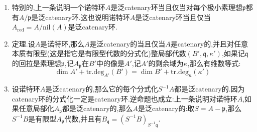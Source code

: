 \begin{enumerate}
\begin{proof}
		下面取$y_i=a_i/b\in\mathrm{Frac}(B),1\le i\le h$,取$C=B[y_1,\cdots,y_h]\subseteq\mathrm{Frac}(B)$,再取$J=(y_1,y_2,\cdots,y_h)C$和$\mathfrak{M}=J+\mathfrak{Q}C=J+\mathfrak{Q}$(因为有$C=B+J$).我们来证明$J\cap B=\mathfrak{q}_1$:一方面意$z\in J$可以表示为$u/b^k$,其中$u\in I^k$,所以如果$z\in J\cap B$,就有足够大的$v$使得$zb^v\in I$,于是$z\in(I:v^bB)=\mathfrak{q}_1$(上述断言),这说明$J\cap B\subseteq\mathfrak{q}_1$.另一方面有$b\mathfrak{q}_1\subseteq I$,所以$\mathfrak{q}_1\subseteq (1/b)I\subseteq J$,所以$\mathfrak{q}_1\subseteq J\cap B$.综上得到$J\cap B=\mathfrak{q}_1$.
		
		\qquad
		
		于是有$\mathfrak{M}\cap B=(J+\mathfrak{Q})\cap B=(J\cap B)+\mathfrak{Q}=\mathfrak{Q}$.于是有$C/J=(B+J)/J\cong B/\mathfrak{q}_1$和$C/\mathfrak{M}=(B+\mathfrak{M})/\mathfrak{M}\cong B/\mathfrak{Q}$.特别的有$\mathfrak{M}$是$C$的素理想,并且$C_{\mathfrak{M}}/JC_{\mathfrak{M}}\cong B_{\mathfrak{Q}}/\mathfrak{q}_1B_{\mathfrak{Q}}$是$d$维局部环,并且$J$被$h$个元生成,所以$C_{\mathfrak{M}}$的每个包含$JC_{\mathfrak{M}}$的极小素理想的高度$\le h$,于是有$\mathrm{ht}(\mathfrak{M})=\dim(C_{\mathfrak{M}})\le d+h<\mathrm{ht}(\mathfrak{Q})$.
		
		\qquad
		
		现在$B$和$C$具有相同的商域,并且$\kappa(\mathfrak{Q})=\kappa(\mathfrak{M})$.但是如果$A/\mathfrak{p}\to B$和$A/\mathfrak{p}\to C$同时满足维数公式的话,也即:
		$$\mathrm{ht}(\mathfrak{M})+\mathrm{tr.deg}_{\kappa(\mathfrak{M}\cap(A/\mathfrak{p}))}\kappa(\mathfrak{M})=\mathrm{ht}(\mathfrak{M}\cap(A/\mathfrak{p}))+\mathrm{tr.deg}_{A/\mathfrak{p}}C$$
		$$\mathrm{ht}(\mathfrak{Q})+\mathrm{tr.deg}_{\kappa(\mathfrak{Q}\cap(A/\mathfrak{p}))}\kappa(\mathfrak{Q})=\mathrm{ht}(\mathfrak{Q}\cap(A/\mathfrak{p}))+\mathrm{tr.deg}_{A/\mathfrak{p}}B$$
		
		这导致$\mathrm{ht}(\mathfrak{Q})=\mathrm{ht}(\mathfrak{M})$,这矛盾.
	\end{proof}
    \item 特别的,上一条说明一个诺特环$A$是泛catenary环当且仅当对每个极小素理想$\mathfrak{p}$都有$A/\mathfrak{p}$是泛catenary环.这也说明诺特环$A$是泛catenary环当且仅当$A_{\mathrm{red}}=A/\mathrm{nil}(A)$是泛catenary环.
    \item 定理.设$A$是诺特环,那么$A$是泛catenary的当且仅当$A$是catenary的,并且对任意本质有限型(这是指它是有限型代数的分式化)整局部代数$(B',\mathfrak{q},\kappa')$,如果记$\mathfrak{q}$的回拉是素理想$\mathfrak{p}$,记$A_{\mathfrak{p}}$在$B'$中的像是$A'$,记$A'$的剩余域为$\kappa$,那么有维数等式:
    $$\dim A'+\mathrm{tr.deg}_{A'}(B')=\dim B'+\mathrm{tr.deg}_{\kappa}(\kappa')$$
    \item 设诺特环$A$是泛catenary的,那么它的每个分式化$S^{-1}A$都是泛catenary的.因为catenary环的分式化一定是catenary环.逆命题也成立:上一条说明对诺特环$A$,如果任意局部化$A_{\mathfrak{p}}$都是泛catenary的,那么$A$是泛catenary的:取$S=A-\mathfrak{p}$,那么$S^{-1}B$是有限型$A_{\mathfrak{p}}$代数,并且有$B_{\mathfrak{q}}=(S^{-1}B)_{S^{-1}\mathfrak{q}}$.
\end{enumerate}

